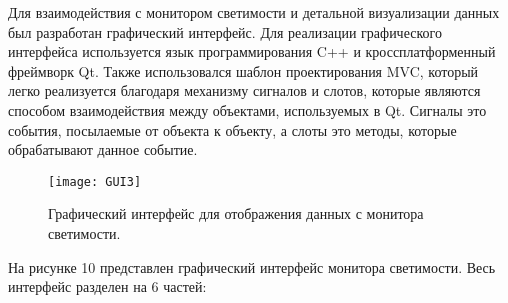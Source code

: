  Для взаимодействия с монитором светимости и детальной визуализации данных был разработан графический интерфейс. Для реализации графического интерфейса используется язык программирования C++ и кроссплатформенный фреймворк Qt. Также использовался шаблон проектирования MVC, который легко реализуется благодаря механизму сигналов и слотов, которые являются способом взаимодействия между объектами, используемых в Qt\cite{SignalSlot}. Сигналы это события, посылаемые от объекта к объекту, а слоты это методы, которые обрабатывают данное событие.\par
\begin{figure}[htp]
  \centering
  \texttt{[image: GUI3]}
  \caption{Графический интерфейс для отображения данных с монитора светимости.}
  \label{fig:galaxy}
\end{figure}
  На рисунке 10 представлен графический интерфейс монитора светимости. Весь интерфейс разделен на 6 частей:

